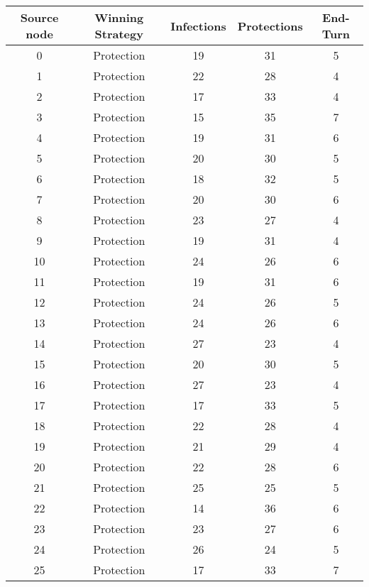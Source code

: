 \documentclass[results.tex]{subfiles}
\begin{document}
\begin{center}
  \begin{tabular}{| c || c | c | c | c |}
    \hline
    {\bfseries Source node} & {\bfseries Winning Strategy} & {\bfseries Infections} & {\bfseries Protections} & {\bfseries End-Turn} \\  %
    \hline\hline
    0 & Protection & 19 & 31 & 5 \\ 
    \hline
    1 & Protection & 22 & 28 & 4 \\ 
    \hline
    2 & Protection & 17 & 33 & 4 \\ 
    \hline
    3 & Protection & 15 & 35 & 7 \\ 
    \hline
    4 & Protection & 19 & 31 & 6 \\ 
    \hline
    5 & Protection & 20 & 30 & 5 \\ 
    \hline
    6 & Protection & 18 & 32 & 5 \\ 
    \hline
    7 & Protection & 20 & 30 & 6 \\ 
    \hline
    8 & Protection & 23 & 27 & 4 \\ 
    \hline
    9 & Protection & 19 & 31 & 4 \\ 
    \hline
    10 & Protection & 24 & 26 & 6 \\ 
    \hline
    11 & Protection & 19 & 31 & 6 \\ 
    \hline
    12 & Protection & 24 & 26 & 5 \\ 
    \hline
    13 & Protection & 24 & 26 & 6 \\ 
    \hline
    14 & Protection & 27 & 23 & 4 \\ 
    \hline
    15 & Protection & 20 & 30 & 5 \\ 
    \hline
    16 & Protection & 27 & 23 & 4 \\ 
    \hline
    17 & Protection & 17 & 33 & 5 \\ 
    \hline
    18 & Protection & 22 & 28 & 4 \\ 
    \hline
    19 & Protection & 21 & 29 & 4 \\ 
    \hline
    20 & Protection & 22 & 28 & 6 \\ 
    \hline
    21 & Protection & 25 & 25 & 5 \\ 
    \hline
    22 & Protection & 14 & 36 & 6 \\ 
    \hline
    23 & Protection & 23 & 27 & 6 \\ 
    \hline
    24 & Protection & 26 & 24 & 5 \\ 
    \hline
    25 & Protection & 17 & 33 & 7 \\ 

\end{tabular}
\end{center}
\end{document}
